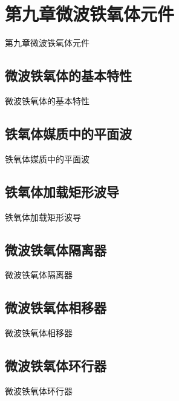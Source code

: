\section{第九章\quad 微波铁氧体元件}
\begin{frame}{第九章\quad 微波铁氧体元件}

\end{frame}

\subsection{微波铁氧体的基本特性}
\begin{frame}{微波铁氧体的基本特性}

\end{frame}

\subsection{铁氧体媒质中的平面波}
\begin{frame}{铁氧体媒质中的平面波}

\end{frame}

\subsection{铁氧体加载矩形波导}
\begin{frame}{铁氧体加载矩形波导}

\end{frame}

\subsection{微波铁氧体隔离器}
\begin{frame}{微波铁氧体隔离器}

\end{frame}

\subsection{微波铁氧体相移器}
\begin{frame}{微波铁氧体相移器}

\end{frame}

\subsection{微波铁氧体环行器}
\begin{frame}{微波铁氧体环行器}

\end{frame}

